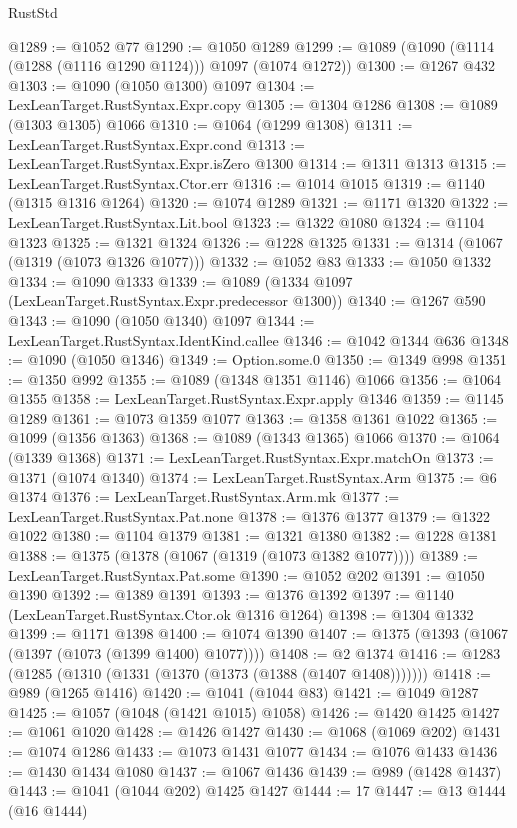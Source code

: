 \begin{lexlean}{RustStd}
\begin{coremodule}
{\begin{coremodule}
{{{{{{{{{{{{{{@1289 := @1052 @77
@1290 := @1050 @1289
@1299 := @1089 (@1090 (@1114 (@1288 (@1116 @1290 @1124))) @1097 (@1074 @1272))
@1300 := @1267 @432
@1303 := @1090 (@1050 @1300) @1097
@1304 := LexLeanTarget.RustSyntax.Expr.copy
@1305 := @1304 @1286
@1308 := @1089 (@1303 @1305) @1066
@1310 := @1064 (@1299 @1308)
@1311 := LexLeanTarget.RustSyntax.Expr.cond
@1313 := LexLeanTarget.RustSyntax.Expr.isZero @1300
@1314 := @1311 @1313
@1315 := LexLeanTarget.RustSyntax.Ctor.err
@1316 := @1014 @1015
@1319 := @1140 (@1315 @1316 @1264)
@1320 := @1074 @1289
@1321 := @1171 @1320
@1322 := LexLeanTarget.RustSyntax.Lit.bool
@1323 := @1322 @1080
@1324 := @1104 @1323
@1325 := @1321 @1324
@1326 := @1228 @1325
@1331 := @1314 (@1067 (@1319 (@1073 @1326 @1077)))
@1332 := @1052 @83
@1333 := @1050 @1332
@1334 := @1090 @1333
@1339 := @1089 (@1334 @1097 (LexLeanTarget.RustSyntax.Expr.predecessor @1300))
@1340 := @1267 @590
@1343 := @1090 (@1050 @1340) @1097
@1344 := LexLeanTarget.RustSyntax.IdentKind.callee
@1346 := @1042 @1344 @636
@1348 := @1090 (@1050 @1346)
@1349 := Option.some.{0}
@1350 := @1349 @998
@1351 := @1350 @992
@1355 := @1089 (@1348 @1351 @1146) @1066
@1356 := @1064 @1355
@1358 := LexLeanTarget.RustSyntax.Expr.apply @1346
@1359 := @1145 @1289
@1361 := @1073 @1359 @1077
@1363 := @1358 @1361 @1022
@1365 := @1099 (@1356 @1363)
@1368 := @1089 (@1343 @1365) @1066
@1370 := @1064 (@1339 @1368)
@1371 := LexLeanTarget.RustSyntax.Expr.matchOn
@1373 := @1371 (@1074 @1340)
@1374 := LexLeanTarget.RustSyntax.Arm
@1375 := @6 @1374
@1376 := LexLeanTarget.RustSyntax.Arm.mk
@1377 := LexLeanTarget.RustSyntax.Pat.none
@1378 := @1376 @1377
@1379 := @1322 @1022
@1380 := @1104 @1379
@1381 := @1321 @1380
@1382 := @1228 @1381
@1388 := @1375 (@1378 (@1067 (@1319 (@1073 @1382 @1077))))
@1389 := LexLeanTarget.RustSyntax.Pat.some
@1390 := @1052 @202
@1391 := @1050 @1390
@1392 := @1389 @1391
@1393 := @1376 @1392
@1397 := @1140 (LexLeanTarget.RustSyntax.Ctor.ok @1316 @1264)
@1398 := @1304 @1332
@1399 := @1171 @1398
@1400 := @1074 @1390
@1407 := @1375 (@1393 (@1067 (@1397 (@1073 (@1399 @1400) @1077))))
@1408 := @2 @1374
@1416 := @1283 (@1285 (@1310 (@1331 (@1370 (@1373 (@1388 (@1407 @1408)))))))
@1418 := @989 (@1265 @1416)
@1420 := @1041 (@1044 @83)
@1421 := @1049 @1287
@1425 := @1057 (@1048 (@1421 @1015) @1058)
@1426 := @1420 @1425
@1427 := @1061 @1020
@1428 := @1426 @1427
@1430 := @1068 (@1069 @202)
@1431 := @1074 @1286
@1433 := @1073 @1431 @1077
@1434 := @1076 @1433
@1436 := @1430 @1434 @1080
@1437 := @1067 @1436
@1439 := @989 (@1428 @1437)
@1443 := @1041 (@1044 @202) @1425 @1427
@1444 := 17
@1447 := @13 @1444 (@16 @1444)
}}}}}}}}}}}}}}
\end{coremodule}}
\end{coremodule}
\end{lexlean}
